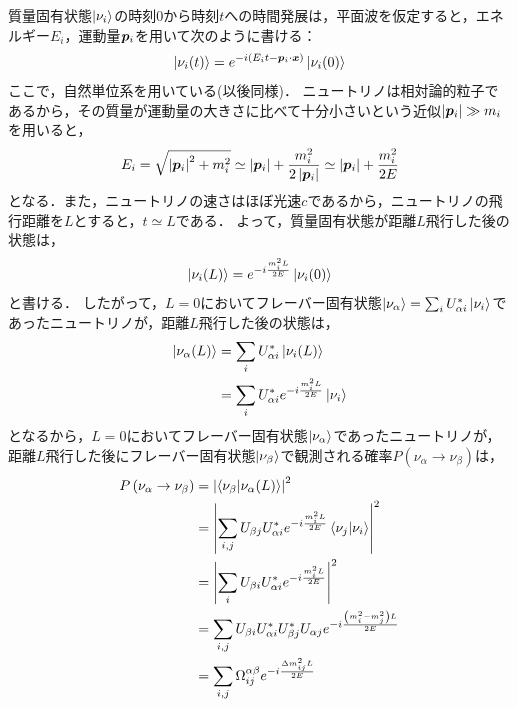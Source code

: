\documentclass[../../main.tex]{subfiles}
\begin{document}
質量固有状態$\ket{\nu_{i}}$の時刻0から時刻$t$への時間発展は，平面波を仮定すると，エネルギー$E_{i}$，運動量$\vb*{p}_{i}$を用いて次のように書ける：
\begin{gather}
  \ket{\nu_{i}(t)}=e^{-i\left(E_{i}t-\vb*{p}_{i}\cdot\vb*{x}\right)}\ket{\nu_{i}(0)}
\end{gather}
ここで，自然単位系を用いている(以後同様)．
ニュートリノは相対論的粒子であるから，その質量が運動量の大きさに比べて十分小さいという近似$\left|\vb*{p}_{i}\right|\gg m_{i}$を用いると，
\begin{gather}
  E_{i}=\sqrt{\left|\vb*{p}_{i}\right|^{2}+m_{i}^{2}}\simeq\left|\vb*{p}_{i}\right|+\frac{m_{i}^{2}}{2\left|\vb*{p}_{i}\right|}\simeq\left|\vb*{p}_{i}\right|+\frac{m_{i}^{2}}{2E}
\end{gather}
となる．また，ニュートリノの速さはほぼ光速$c$であるから，ニュートリノの飛行距離を$L$とすると，$t\simeq L$である．
よって，質量固有状態が距離$L$飛行した後の状態は，
\begin{gather}
  \ket{\nu_{i}(L)}=e^{-i\frac{m_{i}^{2}L}{2E}}\ket{\nu_{i}(0)}
\end{gather}
と書ける．
したがって，$L=0$においてフレーバー固有状態$\ket{\nu_{\alpha}}=\sum_{i}U^{*}_{\alpha i}\ket{\nu_{i}}$であったニュートリノが，距離$L$飛行した後の状態は，
\begin{align}
  \ket{\nu_{\alpha}(L)}
  &=\sum_{i}U^{*}_{\alpha i}\ket{\nu_{i}(L)}\nonumber\\
  &=\sum_{i}U^{*}_{\alpha i}e^{-i\frac{m_{i}^{2}L}{2E}}\ket{\nu_{i}}
\end{align}
となるから，$L=0$においてフレーバー固有状態$\ket{\nu_{\alpha}}$であったニュートリノが，距離$L$飛行した後にフレーバー固有状態$\ket{\nu_{\beta}}$で観測される確率$P\left(\nu_{\alpha}\rightarrow\nu_{\beta}\right)$は，
\begin{align}
  P\left(\nu_{\alpha}\rightarrow\nu_{\beta}\right)
  &=\left|\bra{\nu_{\beta}} \ket{\nu_{\alpha}(L)}\right|^2\nonumber\\
  &=\left|\sum_{i,j}U_{\beta j}U^{*}_{\alpha i}e^{-i\frac{m_{i}^{2}L}{2E}}\bra{\nu_{j}}\ket{\nu_{i}}\right|^2\nonumber\\
  &=\left|\sum_{i}U_{\beta i}U^{*}_{\alpha i}e^{-i\frac{m_{i}^{2}L}{2E}}\right|^2\nonumber\\
  &=\sum_{i,j}U_{\beta i}U^{*}_{\alpha i}U^{*}_{\beta j}U_{\alpha j}e^{-i\frac{\left(m_{i}^{2}-m_{j}^{2}\right)L}{2E}}\nonumber\\
  &=\sum_{i,j}\Omega^{\alpha\beta}_{ij}e^{-i\frac{\Delta m_{ij}^{2}L}{2E}}
\end{align}
\end{document}
